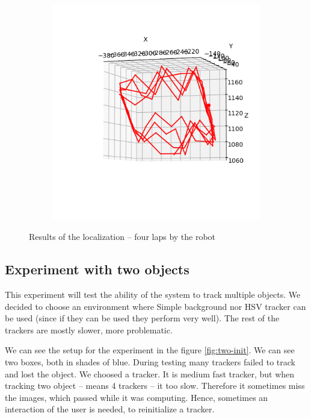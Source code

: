 \begin{figure}
\begin{subfigure}{0.48\linewidth}
	\includegraphics[width=\linewidth]{img/experiments/square-ugly.png}
\end{subfigure}
\caption{Results of the localization -- four laps by the robot}
\label{fig:square-results}
\end{figure}

\subsection{Experiment with two objects}

This experiment will test the ability of the system to track multiple objects.
We decided to choose an environment where Simple background nor HSV tracker can
be used (since if they can be used they perform very well). The rest of the
trackers are mostly slower, more problematic.

We can see the setup for the experiment in the figure \ref{fig:two-init}. We
can see two boxes, both in shades of blue. During testing many trackers failed
to track and lost the object. We choosed a \corr{} tracker. It is medium
fast tracker, but when tracking two object -- means 4 \corr{} trackers --
it too slow. Therefore it sometimes miss the images, which passed while it was
computing. Hence, sometimes an interaction of the user is needed, to
reinitialize a tracker.

